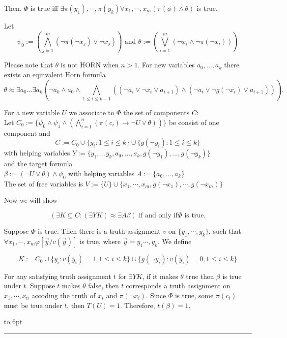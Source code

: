 \documentclass[12pt]{article}
\newenvironment{proof}{\parindent=0pt{\bf Proof: }}{
   \hspace*{\fill}\hbox to 6pt{\leaders\hrule width 6pt height 6pt\hfill}\par}
\begin{document}
\begin{proof}
Then, $\Phi$ is true iff $\exists \pi(y_1),\cdots, \pi(y_k) \forall x_1,\cdots, x_m (\pi(\phi) \wedge \theta)$ is true.


Let $$\psi_0:=\left(\bigwedge_{j=1}^m (\neg \pi(\neg x_j)\vee \neg x_j)\right) \mbox{ and }\theta:=\left(\bigvee_{i=1}^m (\neg x_i\wedge \neg\pi(\neg x_i))\right)$$

Please note that $\theta$ is not HORN  when $n>1$. For new variables $a_0, \ldots, a_k$ there exists an equivalent Horn formula
$$\theta \approx \exists a_0 \ldots \exists a_k (\neg a_k \wedge a_0 \wedge \bigwedge_{1 \leq i \leq k-1} ((\neg a_i \vee \neg x_i \vee a_{i+1}) \wedge (\neg a_i \vee \neg g(\neg x_i) \vee a_{i+1}))).$$

For a new variable $U$ we associate to $\Phi$ the set of components $C$:\\

Let $C_0:=\{\psi_0\wedge\psi_1 \wedge\left( \bigwedge_{i=1}^n(\pi(c_i)\rightarrow \neg U\vee \theta)\right)\}$ be consist of one component and \\

$$C:= C_0  \cup \{y_i: 1 \leq i \leq k\} \cup \{g(\neg y_i): 1 \leq i \leq k\}$$
with helping variables $Y := \{y_1, \ldots y_k, a_0, \ldots, a_k, g(\neg y_1), \ldots, g(\neg y_k)\}$\\
and the target formula \\
$\beta := (\neg U\vee\theta)\wedge \psi_0$ with helping variables $A := \{a_0, \ldots, a_k\}$ \\
The set of free variables is $V:=\{U\}\cup\{x_1,\cdots, x_m,g(\neg x_1),\cdots, g(\neg x_m)\}$

Now we will show

$$(\exists K\subseteq C: (\exists Y K) \approx \exists A \beta) \mbox{ if and only if} \Phi \mbox{ is true.}$$


Suppose $\Phi$ is true. Then there is a truth assignment
$v$ on $\{y_1,\cdots, y_k\}$, such that $\forall x_1,\cdots,x_m\varphi[\vec{y}/v(\vec{y})]$ is true, where $\vec{y}=y_1\cdots,y_k$. We define

$$K := C_0\cup \{y_i: v(y_i)=1, 1\leq i\leq k\}\cup \{g(\neg y_i): v(y_i)=0, 1\leq i\leq k\}$$

For any satisfying truth assignment $t$ for $\exists Y K$, if it makes $\theta$ true then $\beta$ is true under $t$. Suppose $t$ makes $\theta$ false, then $t$ corresponds a truth assignment on $x_1,\cdots, x_n$ accoding the truth of $x_i$ and $\pi(\neg x_i)$. Since $\Phi$ is true, some  $\pi(c_i)$ must be true under $t$, then $T(U)=1$. Therefore, $t(\beta)=1$.


\end{proof}
\end{document}
